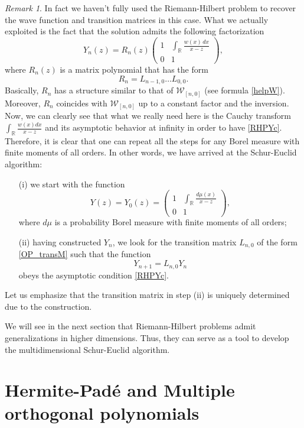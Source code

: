 \documentclass{amsart}
\theoremstyle{remark}
\newtheorem{remark}[theorem]{Remark}
\numberwithin{equation}{section}
\begin{document}
\begin{remark}\label{RfactorRH}
In fact we haven't fully used the Riemann-Hilbert problem to recover the wave function
and transition matrices in this case. What we actually exploited is the fact that the solution admits the following factorization
\[
Y_n(z)=R_n(z)\begin{pmatrix}
                1 & \int_{{\mathbb R}}  \frac{w(x)\,dx}{x-z}  \\
                0 & 1
            \end{pmatrix},
\]
where $R_n(z)$ is a matrix polynomial that has the form
\[
R_n=L_{n-1,0}\dots L_{0,0}.
\]
Basically, $R_n$ has a structure similar to that of ${{\mathcal W}}_{[n,0]}$ (see formula \eqref{helpW}).
Moreover, $R_n$ coincides with ${{\mathcal W}}_{[n,0]}$ up to a constant factor and the inversion.
Now, we can clearly see that what we really need here is the Cauchy transform $\int_{{\mathbb R}}  \frac{w(x)dx}{x-z}$ and its asymptotic 
behavior at infinity
in order to have \eqref{RHPYc}. Therefore, it is clear that one can repeat all the steps for any Borel measure with finite moments of all orders.
In other words, we have arrived at the Schur-Euclid algorithm:
\begin{enumerate}
    \item[(i)]
        we start with the function
        \[
       Y(z)=Y_0(z)=\begin{pmatrix}
                1 & \int_{{\mathbb R}}  \frac{d\mu(x)}{x-z}  \\
                0 & 1
            \end{pmatrix},
         \]
         where $d\mu$ is a probability Borel measure with finite moments of all orders;
    \item[(ii)]
        having constructed $Y_n$, we look for the transition matrix $L_{n,0}$ of the form \eqref{OP_transM} such that
        the function
        \[
        Y_{n+1}=L_{n,0}Y_n
        \]
        obeys the asymptotic condition \eqref{RHPYc}.
\end{enumerate}
Let us emphasize that the transition matrix in step (ii) is uniquely determined due to the construction.

We will see in the next section that Riemann-Hilbert problems
admit generalizations in higher dimensions. Thus, they can serve as a tool to develop the multidimensional
Schur-Euclid algorithm.
\end{remark}

\section{{Her\-mite-Pad\'e}{} and Multiple orthogonal polynomials}\label{sec:4}
\end{document}
